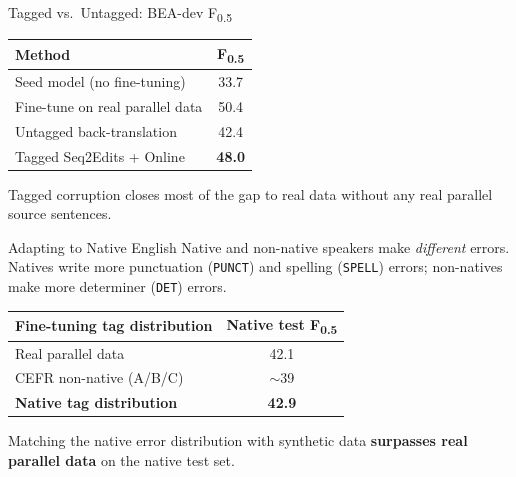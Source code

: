 \documentclass[aspectratio=169]{beamer}
\newcommand{\fhalf}{F\textsubscript{0.5}}
\newcommand{\errtag}[1]{\texttt{#1}}
\begin{document}

\begin{frame}{Tagged vs.\ Untagged: BEA-dev \fhalf}
  \begin{center}
  \begin{tabular}{lc}
    \toprule
    \textbf{Method} & \textbf{\fhalf} \\
    \midrule
    Seed model (no fine-tuning) & 33.7 \\
    Fine-tune on real parallel data & 50.4 \\
    \midrule
    Untagged back-translation & 42.4 \\
    Tagged Seq2Edits + Online & \textbf{48.0} \\
    \bottomrule
  \end{tabular}
  \end{center}

  \vspace{1em}
  Tagged corruption closes most of the gap to real data
  without any real parallel source sentences.
\end{frame}

\begin{frame}{Adapting to Native English}
  Native and non-native speakers make \emph{different} errors.
  Natives write more punctuation (\errtag{PUNCT}) and spelling (\errtag{SPELL}) errors;
  non-natives make more determiner (\errtag{DET}) errors.\\[1.5em]

  \begin{center}
  \begin{tabular}{lc}
    \toprule
    \textbf{Fine-tuning tag distribution} & \textbf{Native test \fhalf} \\
    \midrule
    Real parallel data & 42.1 \\
    CEFR non-native (A/B/C) & $\sim$39 \\
    \textbf{Native tag distribution} & \textbf{42.9} \\
    \bottomrule
  \end{tabular}
  \end{center}

  \vspace{1em}
  Matching the native error distribution with synthetic data
  \textbf{surpasses real parallel data} on the native test set.
\end{frame}
\end{document}
